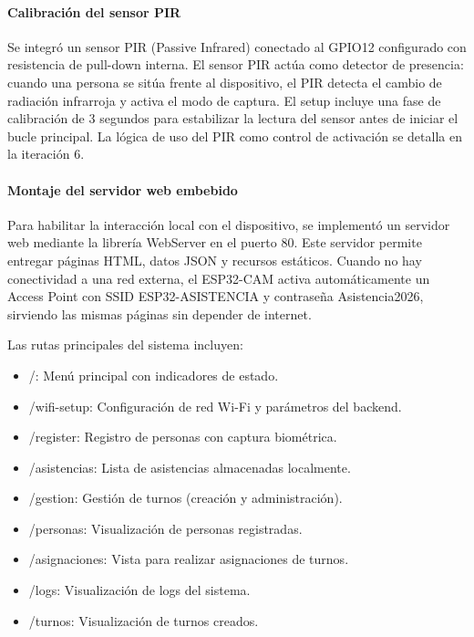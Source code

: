 \paragraph{Calibración del sensor PIR}

Se integró un sensor PIR (Passive Infrared) conectado al GPIO12 configurado con resistencia de pull-down interna. El sensor PIR actúa como detector de presencia: cuando una persona se sitúa frente al dispositivo, el PIR detecta el cambio de radiación infrarroja y activa el modo de captura. El setup incluye una fase de calibración de 3 segundos para estabilizar la lectura del sensor antes de iniciar el bucle principal. La lógica de uso del PIR como control de activación se detalla en la iteración 6.

\paragraph{Montaje del servidor web embebido}

Para habilitar la interacción local con el dispositivo, se implementó un servidor web mediante la librería WebServer en el puerto 80. Este servidor permite entregar páginas HTML, datos JSON y recursos estáticos. Cuando no hay conectividad a una red externa, el ESP32-CAM activa automáticamente un Access Point con SSID ESP32-ASISTENCIA y contraseña Asistencia2026, sirviendo las mismas páginas sin depender de internet.

Las rutas principales del sistema incluyen:

\begin{itemize}
    \item /: Menú principal con indicadores de estado.
    \item /wifi-setup: Configuración de red Wi-Fi y parámetros del backend.
    \item /register: Registro de personas con captura biométrica.
    \item /asistencias: Lista de asistencias almacenadas localmente.
    \item /gestion: Gestión de turnos (creación y administración).
    \item /personas: Visualización de personas registradas.
    \item /asignaciones: Vista para realizar asignaciones de turnos.
    \item /logs: Visualización de logs del sistema.
    \item /turnos: Visualización de turnos creados.
\end{itemize}

